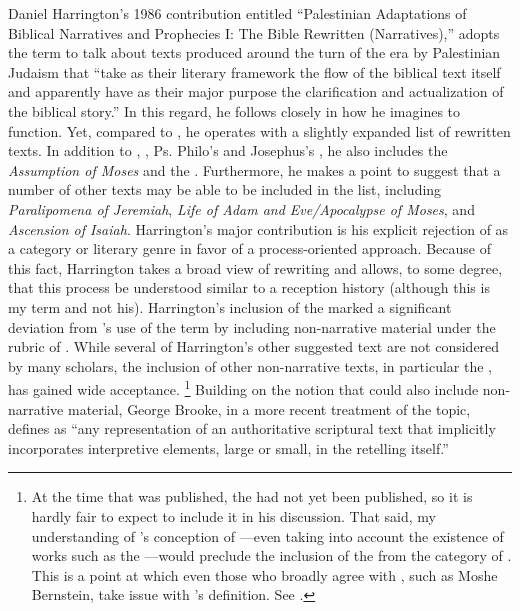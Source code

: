 Daniel Harrington's 1986 contribution entitled ``Palestinian Adaptations of Biblical Narratives and Prophecies I: The Bible Rewritten (Narratives),'' adopts the term \rwb to talk about texts produced around the turn of the era by Palestinian Judaism that ``take as their literary framework the flow of the biblical text itself and apparently have as their major purpose the clarification and actualization of the biblical story.''%
    \autocite[239]{harrington_kraft-nickelsburg1986}
In this regard, he follows \vermes closely in how he imagines \rwb to function. Yet, compared to \vermes, he operates with a slightly expanded list of rewritten texts. In addition to \jub, \ga, Ps. Philo's \lab and Josephus's \ant, he also includes the \emph{Assumption of Moses} and the \templescroll. Furthermore, he makes a point to suggest that a number of other texts may be able to be included in the list, including \emph{Paralipomena of Jeremiah}, \emph{Life of Adam and Eve/Apocalypse of Moses}, and \emph{Ascension of Isaiah}. Harrington's major contribution is his explicit rejection of \rwb as a category or literary genre in favor of a process-oriented approach. Because of this fact, Harrington takes a broad view of rewriting and allows, to some degree, that this process be understood similar to a reception history (although this is my term and not his). Harrington's inclusion of the \templescroll marked a significant deviation from \vermes's use of the term by including non-narrative material under the rubric of \rwb. While several of Harrington's other suggested text are not considered \rwb by many scholars, the inclusion of other non-narrative texts, in particular the \templescroll, has gained wide acceptance.%
    \footnote{%
        At the time that  was published, the \templescroll had not yet been published, so it is hardly fair to expect \vermes to include it in his discussion. That said, my understanding of \vermes's conception of \rwb---even taking into account the existence of works such as the \templescroll---would preclude the inclusion of the \templescroll from the category of \rwb. This is a point at which even those who broadly agree with \vermes, such as Moshe Bernstein, take issue with \vermes's definition. See 
        \cite[183--184]{bernstein_textus2005}.}
%
Building on the notion that \rwb could also include non-narrative material, George Brooke, in a more recent treatment of the topic, defines \rwb as ``any representation of an authoritative scriptural text that implicitly incorporates interpretive elements, large or small, in the retelling itself.''%
